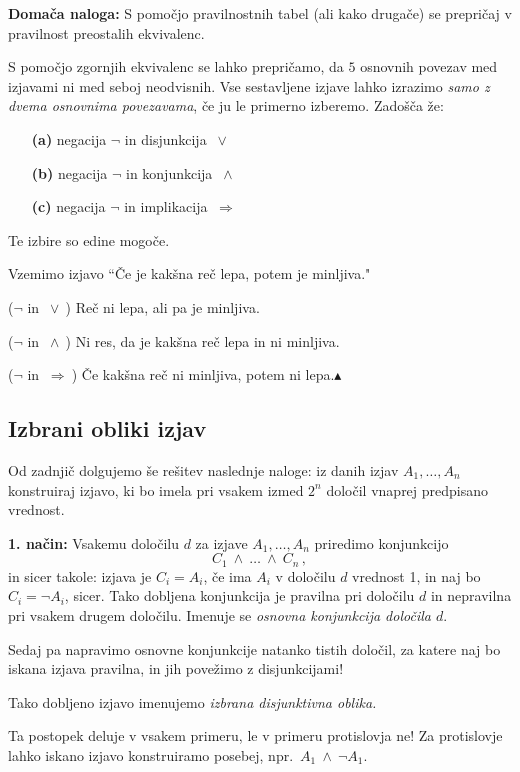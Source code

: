 \documentclass[12pt,a4paper]{article}
\def\ali {{~\vee~}}
\def\inn {{~\wedge~}}
\def\sledi {{~\Rightarrow~}}
\def\zgled{\noindent{\bf\color{blue} Zgled: }}
\def\kz{{\hfill{\color{blue}$\blacktriangle$}}}%
\begin{document}
{\bf Domača naloga:} S pomočjo pravilnostnih tabel (ali kako drugače) se prepričaj v pravilnost
preostalih ekvivalenc.

\bigskip
S pomočjo zgornjih ekvivalenc se lahko prepričamo, da $5$ osnovnih povezav med izjavami ni med seboj neodvisnih.
Vse sestavljene izjave lahko izrazimo {\em samo z dvema osnovnima povezavama}, če ju le primerno izberemo.
Zadošča že:
\begin{enumerate}
  \item[{\bf (a)}] negacija $\neg$ in  disjunkcija $\ali$
  \item[{\bf (b)}] negacija $\neg$ in konjunkcija $\inn$
  \item[{\bf (c)}] negacija $\neg$ in implikacija $\sledi$
\end{enumerate}
Te izbire so edine mogoče.

\medskip
\zgled

Vzemimo izjavo ``Če je kakšna reč lepa, potem je minljiva."

($\neg$ in $\ali$) Reč ni lepa, ali pa je minljiva.

($\neg$ in $\inn$) Ni res, da je kakšna reč lepa in ni minljiva.

($\neg$ in $\sledi$) Če kakšna reč ni minljiva, potem ni lepa.\kz


\subsection{Izbrani obliki izjav}

Od zadnjič dolgujemo še rešitev naslednje naloge: iz danih izjav $A_1,\ldots, A_n$ konstruiraj izjavo,
ki bo imela pri vsakem izmed $2^n$ določil vnaprej predpisano vrednost.

{\bf 1. način:}
Vsakemu določilu $d$ za izjave $A_1,\ldots, A_n$ priredimo konjunkcijo
$$C_1\inn \ldots \inn C_n\,,$$
in sicer takole: izjava je $C_i = A_i$, če ima $A_i$ v določilu $d$ vrednost 1, in naj bo
$C_i = \neg A_i$, sicer.
Tako dobljena konjunkcija je pravilna pri določilu $d$ in nepravilna pri vsakem drugem določilu.
Imenuje se {\em osnovna konjunkcija določila $d$}.

Sedaj pa napravimo osnovne konjunkcije natanko tistih določil, za katere naj
bo iskana izjava pravilna, in jih povežimo z disjunkcijami!

Tako dobljeno izjavo imenujemo {\em izbrana disjunktivna oblika.}

Ta postopek deluje v vsakem primeru, le v primeru protislovja ne! Za protislovje lahko iskano izjavo
konstruiramo posebej, npr.~$A_1\inn \neg A_1$.
\end{document}
